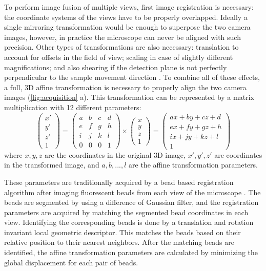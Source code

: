 To perform image fusion of multiple views, first image registration is necessary: the coordinate systems of the views have to be properly overlapped. Ideally a single mirroring transformation would be enough to superpose the two camera images, however, in practice the microscope can never be aligned with such precision. Other types of transformations are also necessary: translation to account for offsets in the field of view; scaling in case of slightly different magnifications; and also shearing if the detection plane is not perfectly perpendicular to the sample movement direction \cite{krzic_multiple-view_2009}. To combine all of these effects, a full, 3D affine transformation is necessary to properly align the two camera images (\autoref{fig:acquisition} a). This transformation can be represented by a matrix multiplication with 12 different parameters:
\[  
\begin{pmatrix}
x'\\
y'\\
z'\\
1
\end{pmatrix}
=
\begin{pmatrix}
a & b & c & d \\ 
e & f & g & h \\ 
i & j & k & l \\
0 & 0 & 0 & 1 
\end{pmatrix}
\times
\begin{pmatrix}
x\\
y\\
z\\
1
\end{pmatrix}
=
\begin{pmatrix}
a x + b y + c z + d\\ 
e x + f y + g z + h\\ 
i x + j y + k z + l\\
1
\end{pmatrix}
\]
where $x, y, z$ are the coordinates in the original 3D image, $x', y', z'$ are coordinates in the transformed image, and $a, b, ..., l$ are the affine transformation parameters.

These parameters are traditionally acquired by a bead based registration algorithm after imaging fluorescent beads from each view of the microscope \cite{preibisch_bead-based_2009,preibisch_software_2010}. The beads are segmented by using a difference of Gaussian filter, and the registration parameters are acquired by matching the segmented bead coordinates in each view. Identifying the corresponding beads is done by a translation and rotation invariant local geometric descriptor. This matches the beads based on their relative position to their nearest neighbors. After the matching beads are identified, the affine transformation parameters are calculated by minimizing the global displacement for each pair of beads.

